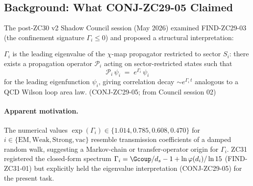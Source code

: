 \documentclass[12pt, a4paper]{article}
\begin{document}
\begin{abstract}
\textbf{Scope.} ZC32 does not close GAP-ZC29-03 (formal
confinement proof from $R_1$-layer dynamics); the present
operator content is algebraic, not dynamical. GAP-ZC29-03
remains open with status sharpened: any future formal proof
must construct the $R_1$-layer semigroup or transfer
operator independently and connect it to $M_i$.

\textbf{v2 R-layer audit.} ZC32 v1 was composed without
reading ZC25--ZC28 (a Pre-Work Audit Protocol violation).
The v2 audit applies the Resolution-Scale Protocol of
DEF-ZC26-RS01 to every v1 atomic unit (§\ref{sec:r-layer-audit}),
cross-references the structural overlap between THM-ZC32-01
multiplicity and THM-ZC27-01 (§\ref{sec:cor-zc32-01}),
adds an explicit layer-crossing flag to CONJ-ZC32-01
(§\ref{sec:conj-zc32-01}), and registers \textbf{PM-ZC32-02}
as scar tissue for the audit gap itself. No v1 atomic unit
is retracted; THM-ZC32-01 proof is unchanged.
\end{abstract}

\tableofcontents
\newpage

\subsection{Background: What CONJ-ZC29-05 Claimed}
\label{sec:background}

The post-ZC30 v2 Shadow Council session (May 2026) examined
FIND-ZC29-03 (the confinement signature $\Gamma_i \leq 0$) and
proposed a structural interpretation:

\begin{formalbox}[title={CONJ-ZC29-05 (as proposed by Council
  session 02): $\chi$-map propagator eigenvalue}]
$\Gamma_i$ is the leading eigenvalue of the $\chi$-map
propagator restricted to sector $S_i$: there exists a
propagation operator $\mathcal{P}_i$ acting on
sector-restricted states such that
\[
  \mathcal{P}_i \,\psi_i \;=\; e^{\Gamma_i}\,\psi_i
\]
for the leading eigenfunction $\psi_i$, giving correlation
decay $\sim e^{\Gamma_i\,t}$ analogous to a QCD Wilson loop
area law.
\hfill\textup{(CONJ-ZC29-05; from Council session 02)}
\end{formalbox}

\paragraph{Apparent motivation.}
The numerical values $\exp(\Gamma_i) \in \{1.014, 0.785,
0.608, 0.470\}$ for $i \in \{\text{EM}, \text{Weak},
\text{Strong}, \text{vac}\}$ resemble transmission
coefficients of a damped random walk, suggesting a
Markov-chain or transfer-operator origin for $\Gamma_i$.
ZC31 registered the closed-form spectrum
$\Gamma_i = \Gcoup/d_s - 1 + \ln\varphi(d_i)/\ln 15$
(FIND-ZC31-01) but explicitly held the eigenvalue
interpretation (CONJ-ZC29-05) for the present task.
\end{document}
